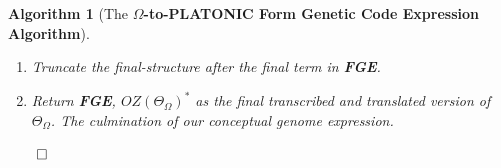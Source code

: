 \documentclass[a4paper, 18pt]{book} %
\newtheorem{alg}{Algorithm}
\newcommand{\invpi}{\rotatebox[origin=c]{180}{$\pi$}}
\begin{document}
\begin{alg}[The \textbf{$\Omega$-to-PLATONIC Form Genetic Code Expression Algorithm}]
\begin{enumerate}
{\begin{enumerate}
{\begin{enumerate}
{\begin{equation}
\label{EQFBOXED}
 \boxed{\omega_i^*} = \rho_j \in \lnot(\psi_{pl}) +  j \times \omega_i^* : j = I(\omega_i^*,\overset{>}{OZ(\Theta_\Omega)})
\end{equation}\\

	\begin{enumerate}
	\item{Place that encoded version, $\boxed{\omega_i^*}$, along the existing \textbf{FGE} structure at the next vacant position ($\invpi(\Theta_\Omega)+i$). Expressible with another version of \textbf{Equation \ref{EQEXTFGEJOINT}} as:
	
	\begin{equation}
	\label{EQEXTFGEPF}
		\boxed{OZ(\Theta_\Omega)}^* = \boxed{OZ(\Theta_\Omega)}^* \cdot \boxed{\omega_i^*}
		\end{equation}	
		
		And equivalently:
		
		\begin{equation}
		\label{EQEXTFGEPFSUF}
		\boxed{OZ(\Theta_\Omega)} = \boxed{OZ(\Theta_\Omega)} \cdot \boxed{\omega_i^*}
		\end{equation}	
		
	Where the special term, $\boxed{\omega_i^*}$, as per \textbf{Equation \ref{EQFBOXED}}, is basically the PLATONIC Form corresponding to position $j$ in $\lnot(\psi_{pf})$ --- a \textbf{complement/inverted symbol set}, thus one of the final form platonic geometry structures, but also with the intermediate form $\omega_i^*$ expressed $j$ times, such that:\\
	
	\begin{equation}
	1 \leq (j = (\invpi(\psi_{pf})-i)) \leq \invpi(\psi_{pf}) \geq \invpi(\overset{>}{OZ(\Theta_\Omega)})
	\end{equation}\\
	
	
	as depicted in example \textbf{Figure \ref{FIGEXTFGEPFSUF}}, with each expression of $\omega_i^*$ attached to one of the $j$ \textbf{appendage spots} on the shape for $\boxed{\omega_i^*}$.
	}
	\item Proceed to the next symbol in \textbf{IFA MSS}, $\overset{>}{OZ(\Theta_\Omega)}$\\ (loop from \textbf{Step\#2(b))}.
	\end{enumerate}
	}
\end{enumerate}
}
\end{enumerate}
}

\item Truncate the final-structure after the final term in \textbf{FGE}.
\item Return \textbf{FGE}, $\boxed{OZ(\Theta_\Omega)}^*$ as the final transcribed and translated version of $\Theta_\Omega$. The culmination of our conceptual genome expression.
\end{enumerate}
$\qed$
\end{alg}
\end{document}
